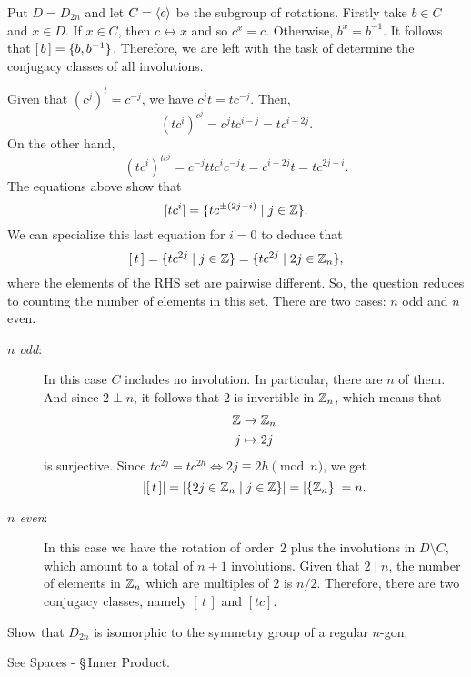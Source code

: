 \begin{solution} Put $D=D_{2n}$ and let $C=\langle c\rangle$ be the subgroup of rotations. Firstly take $b\in C$ and $x\in D$. If $x\in C$, then $c\leftrightarrow x$ and so $c^x=c$. Otherwise, $b^x=b^{-1}$. It follows that $[\,b\,]=\{b,b^{-1}\}$. Therefore, we are left with the task of determine the conjugacy classes of all involutions.

Given that $(c^j)^t=c^{-j}$, we have $c^jt=tc^{-j}$. Then, 
$$
    (tc^i)^{c^j} = c^jtc^{i-j}=tc^{i-2j}.
$$
On the other hand,
$$
    (tc^i)^{tc^j} = c^{-j}ttc^ic^{-j}t = c^{i-2j}t=tc^{2j-i}.
$$
 The equations above show that
$$
    [tc^i]=\{tc^{\pm(2j-i)}\mid j\in\mathbb{Z}\}.
$$
We can specialize this last equation for $i=0$ to deduce that
\begin{equation}\label{eq3}
    [\,t\,]=\{tc^{2j}\mid j\in\mathbb{Z}\} = \{tc^{2j}\mid 2j\in\mathbb{Z}_n\},
\end{equation}
where the elements of the RHS set are pairwise different. So, the question reduces to counting the number of elements in this set. There are two cases: $n$ odd and $n$ even.
\begin{description}
    \item[{\it $n$ odd\/}:] In this case $C$ includes no involution. In particular, there are $n$ of them. And since $2\perp n$, it follows that $2$ is invertible in $\mathbb{Z}_n$, which means that
    \begin{align*}
        \mathbb{Z}&\to\mathbb{Z}_n\\
        j&\mapsto 2j
    \end{align*}
    is surjective. Since $tc^{2j}=tc^{2h}\iff 2j\equiv2h\pmod n$, we get
    $$
        |[\,t\,]|=|\{2j\in\mathbb{Z}_n\mid j\in\mathbb{Z}\}|=|\{\mathbb{Z}_n\}|=n.
    $$
    \item[{\it $n$ even\/}:] In this case we have the rotation of order~$2$ plus the involutions in $D\setminus C$, which amount to a total of $n+1$ involutions. Given that $2\mid n$, the number of elements in $\mathbb{Z}_n$ which are multiples of $2$ is $n/2$. Therefore, there are two conjugacy classes, namely $[\,t\,]$ and $[tc]$.
\end{description}
\end{solution}

\begin{probl}
    Show that $D_{2n}$ is isomorphic to the symmetry group of a regular $n$-gon.
\end{probl}

\begin{solution} See Spaces - \S\,Inner Product.\end{solution}

